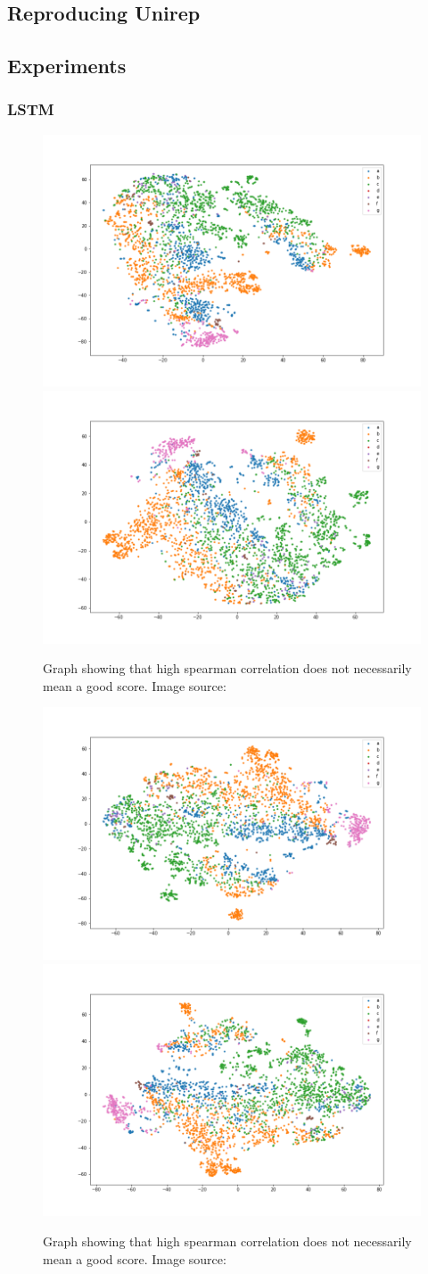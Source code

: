 \subsection{Reproducing Unirep}
\subsection{Experiments}

\subsubsection{LSTM}

\begin{figure}[!ht]
  \centering
  \includegraphics[width=0.4\linewidth]{latex/imgs/tsne_2_layer_05_drop_final.png}
  \includegraphics[width=0.4\linewidth]{latex/imgs/tsne_2_layer_05_drop_minloss.png}
  \caption{Graph showing that high spearman correlation does not necessarily mean a good score. Image source:\cite{spearman}}
\end{figure}
\begin{figure}[!ht]
  \centering
  \includegraphics[width=0.4\linewidth]{latex/imgs/tsne_2_layer_no_drop_final.png}
  \includegraphics[width=0.4\linewidth]{latex/imgs/tsne_2_layer_no_drop_minloss.png}
  \caption{Graph showing that high spearman correlation does not necessarily mean a good score. Image source:\cite{spearman}}
\end{figure}
